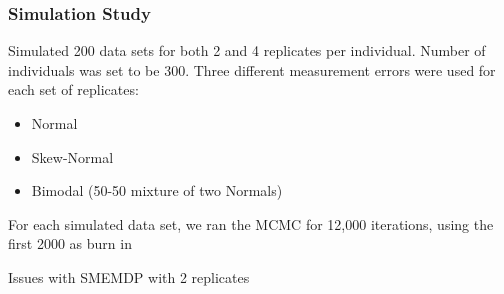\documentclass[handout]{beamer}\usepackage[]{graphicx}\usepackage[]{color}
\begin{document}
\begin{frame}
\frametitle{Simulation Study}

Simulated 200 data sets for both 2 and 4 replicates per individual. Number of individuals was set to be 300. Three different measurement errors were used for each set of replicates:

\begin{itemize}
\item
Normal
\item
Skew-Normal
\item
Bimodal (50-50 mixture of two Normals)
\end{itemize}

\vspace{0.2cm}

For each simulated data set, we ran the MCMC for 12,000 iterations, using the first 2000 as burn in

\vspace{0.2cm}

Issues with SMEMDP with 2 replicates

\end{frame}
\end{document}
